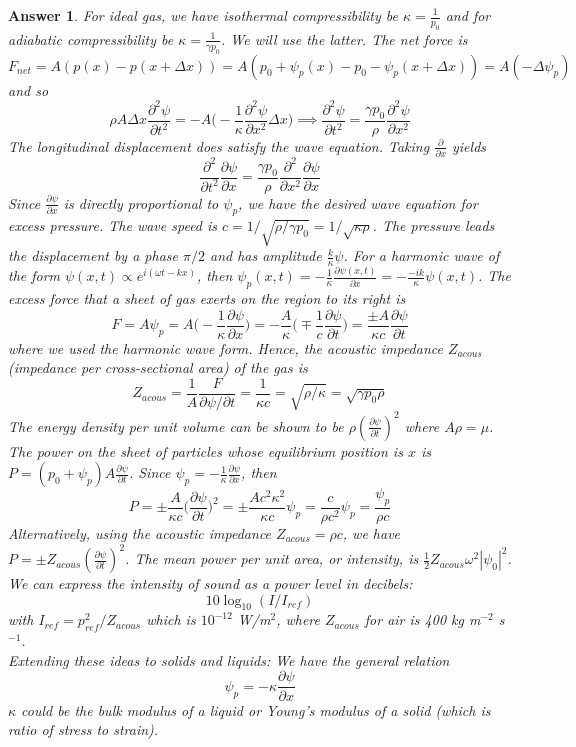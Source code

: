 \documentclass[a4paper]{article}
\newtheorem{ans}{Answer}[subsection]
\theoremstyle{new}
\begin{document}
\begin{ans}
For ideal gas, we have isothermal compressibility be $\kappa=\frac{1}{p_0}$ and for adiabatic compressibility be $\kappa=\frac{1}{\gamma p_0}$. We will use the latter. The net force is $F_{net}=A(p(x)-p(x+\Delta x))=A(p_0+\psi_p(x)-p_0-\psi_p(x+\Delta x))=A(-\Delta\psi_p)$ and so
$$\rho A\Delta x\frac{\partial^2\psi}{\partial t^2}=-A\bigg(-\frac{1}{\kappa}\frac{\partial^2\psi}{\partial x^2}\Delta x\bigg)\implies\frac{\partial^2\psi}{\partial t^2}=\frac{\gamma p_0}{\rho}\frac{\partial^2\psi}{\partial x^2}$$
The longitudinal displacement does satisfy the wave equation. Taking $\frac{\partial}{\partial x}$ yields $$\frac{\partial^2}{\partial t^2}\frac{\partial\psi}{\partial x}=\frac{\gamma p_0}{\rho}\frac{\partial^2}{\partial x^2}\frac{\partial\psi}{\partial x}$$
Since $\frac{\partial\psi}{\partial x}$ is directly proportional to $\psi_p$, we have the desired wave equation for excess pressure. The wave speed is  $c=1/\sqrt{\rho/\gamma p_0}=1/\sqrt{\kappa\rho}$. The pressure leads the displacement by a phase $\pi/2$ and has amplitude $\frac{k}{\kappa}\psi$. For a harmonic wave of the form $\psi(x,t)\propto e^{i(\omega t-kx)}$, then $\psi_p(x,t)=-\frac{1}{\kappa}\frac{\partial\psi(x,t)}{\partial x}=-\frac{-ik}{\kappa}\psi(x,t)$. The excess force that a sheet of gas exerts on the region to its right is $$F=A\psi_p=A\bigg(-\frac{1}{\kappa}\frac{\partial\psi}{\partial x}\bigg)=-\frac{A}{\kappa}\bigg(\mp\frac{1}{c}\frac{\partial\psi}{\partial t}\bigg)=\frac{\pm A}{\kappa c}\frac{\partial\psi}{\partial t}$$
where we used the harmonic wave form. Hence, the acoustic impedance  $Z_{acous}$ (impedance per cross-sectional area) of the gas is $$Z_{acous}=\frac{1}{A}\frac{F}{\partial\psi/\partial t}=\frac{1}{\kappa c}=\sqrt{\rho/\kappa}=\sqrt{\gamma p_0\rho}$$
The energy density per unit volume can be shown to be $\rho(\frac{\partial\psi}{\partial t})^2$ where $A\rho=\mu$. The power on the sheet of particles whose equilibrium position is $x$ is $P=(p_0+\psi_p)A\frac{\partial\psi}{\partial t}$. Since $\psi_p=-\frac{1}{\kappa}\frac{\partial\psi}{\partial x}$, then $$P=\pm\frac{A}{\kappa c}\bigg(\frac{\partial\psi}{\partial t}\bigg)^2=\pm\frac{Ac^2\kappa^2}{\kappa c}\psi_p=\frac{c}{\rho c^2}\psi_p=\frac{\psi_p}{\rho c}$$ 
Alternatively, using the acoustic impedance $Z_{acous}=\rho c$, we have $P=\pm Z_{acous}(\frac{\partial\psi}{\partial t})^2$. The mean power per unit area, or intensity, is  $\frac{1}{2}Z_{acous}\omega^2|\psi_0|^2$. We can express the intensity of sound as a power level in decibels:
$$10\log_{10}(I/I_{ref})$$
with $I_{ref}=p_{ref}^2/Z_{acous}$ which is $10^{-12}$ W/m$^2$, where $Z_{acous}$ for air is 400 kg m$^{-2}$ s$^{-1}$.\\[5pt]
Extending these ideas to solids and liquids: We have the general relation $$\psi_p=-\kappa\frac{\partial\psi}{\partial x}$$
$\kappa$ could be the bulk modulus of a liquid or Young's modulus of a solid (which is ratio of stress to strain).
\end{ans}
\end{document}
